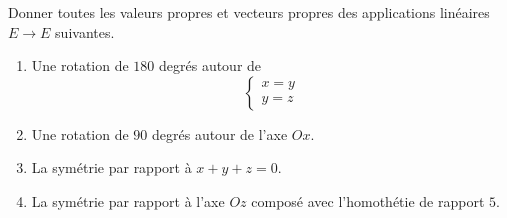 \begin{exercice}\label{exoTP50003}

	Donner toutes les valeurs propres et vecteurs propres des applications linéaires $E\to E$ suivantes.
	\begin{enumerate}

		\item
			Une rotation de $180$ degrés autour de
			\begin{equation}
				\left\{
				\begin{array}{ll}
					x=y\\
					y=z
				\end{array}
				\right.
			\end{equation}
		
		\item
			Une rotation de $90$ degrés autour de l'axe $Ox$.

		\item
			La symétrie par rapport à $x+y+z=0$.

		\item
			La symétrie par rapport à l'axe $Oz$ composé avec l'homothétie de rapport $5$.

	\end{enumerate}
	

\end{exercice}
